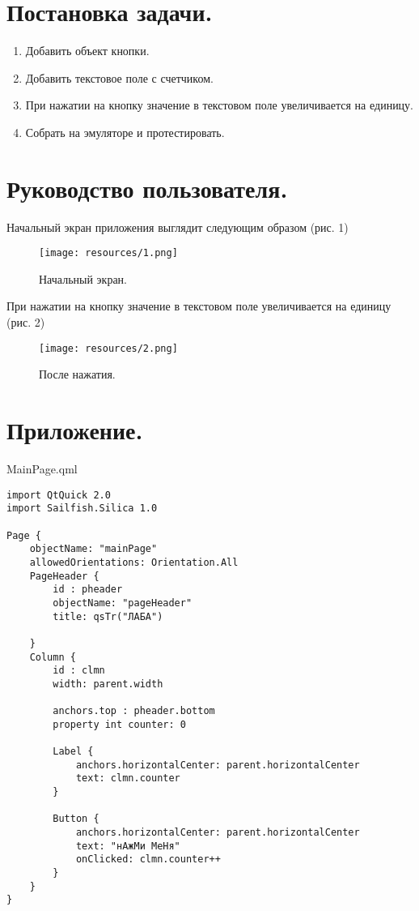 \documentclass[a4document]{article}
\begin{document}
{
\newpage
\section{Постановка задачи.} 
\par 
\begin{enumerate}
    \item Добавить объект кнопки.
    \item Добавить текстовое поле с счетчиком. 
    \item При нажатии на кнопку значение в текстовом поле увеличивается на единицу.
    \item Собрать на эмуляторе и протестировать.
\end{enumerate}

}

{
\newpage
\section{Руководство пользователя.} 
\par 
Начальный экран приложения выглядит следующим образом (рис. 1)
\begin{figure}[htp]
    \centering
    \texttt{[image: resources/1.png]}
    \caption{Начальный экран.}
    \label{fig:pk1}
\end{figure} 

\par \noindent
При нажатии на кнопку значение в текстовом поле увеличивается на единицу (рис. 2)
\begin{figure}[htp]
    \centering
    \texttt{[image: resources/2.png]}
    \caption{После нажатия.}
    \label{fig:pk2}
\end{figure}

}

{
\newpage
\section{Приложение.} 
\par {MainPage.qml}
\begin{verbatim} 
import QtQuick 2.0
import Sailfish.Silica 1.0

Page {
    objectName: "mainPage"
    allowedOrientations: Orientation.All
    PageHeader {
        id : pheader
        objectName: "pageHeader"
        title: qsTr("ЛАБА")

    }
    Column {
        id : clmn
        width: parent.width

        anchors.top : pheader.bottom
        property int counter: 0

        Label {
            anchors.horizontalCenter: parent.horizontalCenter
            text: clmn.counter
        }

        Button {
            anchors.horizontalCenter: parent.horizontalCenter
            text: "нАжМи МеНя"
            onClicked: clmn.counter++
        }
    }
}
\end{verbatim}

}
\end{document}
